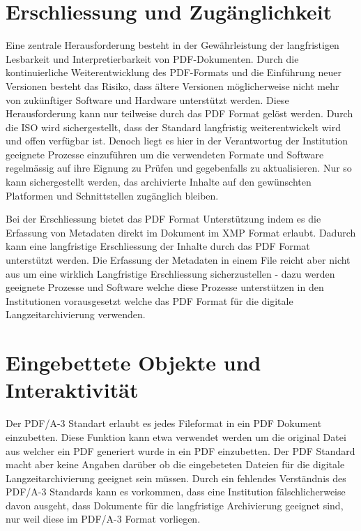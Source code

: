 \documentclass[a4paper,oneside, 12pt]{report}
\begin{document}
\section{Erschliessung und Zugänglichkeit}
 Eine zentrale Herausforderung besteht in der Gewährleistung der langfristigen Lesbarkeit und Interpretierbarkeit von \ac{PDF}-Dokumenten. Durch die kontinuierliche Weiterentwicklung des \ac{PDF}-Formats und die Einführung neuer Versionen besteht das Risiko, dass ältere Versionen möglicherweise nicht mehr von zukünftiger Software und Hardware unterstützt werden. Diese Herausforderung kann nur teilweise durch das PDF Format gelöst werden. Durch die \ac{ISO} wird sichergestellt, dass der Standard langfristig weiterentwickelt wird und offen verfügbar ist. Denoch liegt es hier in der Verantwortug der Institution geeignete Prozesse einzuführen um die verwendeten Formate und Software regelmässig auf ihre Eignung zu Prüfen und gegebenfalls zu aktualisieren. Nur so kann sichergestellt werden, das archivierte Inhalte auf den gewünschten Platformen und Schnittstellen zugänglich bleiben. 

 Bei der Erschliessung bietet das PDF Format Unterstützung indem es die Erfassung von Metadaten direkt im Dokument im XMP Format erlaubt. Dadurch kann eine langfristige Erschliessung der Inhalte durch das PDF Format unterstützt werden. Die Erfassung der Metadaten in einem File reicht aber nicht aus um eine wirklich Langfristige Erschliessung sicherzustellen - dazu werden geeignete Prozesse und Software welche diese Prozesse unterstützen in den Institutionen vorausgesetzt welche das PDF Format für die digitale Langzeitarchivierung verwenden.

\section{Eingebettete Objekte und Interaktivität}
Der PDF/A-3 Standart erlaubt es jedes Fileformat in ein PDF Dokument einzubetten. Diese Funktion kann etwa verwendet werden um die original Datei aus welcher ein PDF generiert wurde in ein PDF einzubetten. Der PDF Standard macht aber keine Angaben darüber ob die eingebeteten Dateien für die digitale Langzeitarchivierung geeignet sein müssen. Durch ein fehlendes Verständnis des PDF/A-3 Standards kann es vorkommen, dass eine Institution fälschlicherweise davon ausgeht, dass Dokumente für die langfristige Archivierung geeignet sind, nur weil diese im PDF/A-3 Format vorliegen.


\end{document}
